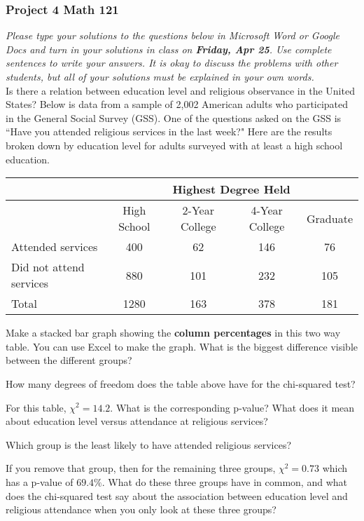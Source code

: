 \documentclass[12pt]{exam}
\begin{document}
\subsubsection*{Project 4 \hfill Math 121}

\textit{Please type your solutions to the questions below in Microsoft Word or Google Docs and turn in your solutions in class on \textbf{Friday, Apr 25}. Use complete sentences to write your answers. It is okay to discuss the problems with other students, but all of your solutions must be explained in your own words. } \\

\noindent
Is there a relation between education level and religious observance in the United States? Below is data from a sample of 2{,}002 American adults who participated in the General Social Survey (GSS).
One of the questions asked on the GSS is ``Have you attended religious services in the last week?"  Here are the results broken down by education level for adults surveyed with at least a high school education. 

\begin{center}
\begin{tabular}{l|cccc} 
& \multicolumn{4}{c}{Highest Degree Held} \\ \hline 
 & High School & 2-Year College & 4-Year College & Graduate \\ \hline
Attended services & 400 & 62 & 146 & 76 \\
Did not attend services & 880 & 101 & 232 & 105 \\ \hline
Total & 1280 & 163 & 378 & 181 \\ 
\end{tabular}
\end{center}

\begin{questions}
\item Make a stacked bar graph showing the \textbf{column percentages} in this two way table. You can use Excel to make the graph. What is the biggest difference visible between the different groups?
\vfill

\item How many degrees of freedom does the table above have for the chi-squared test?
\vfill

\item For this table, $\chi^2 = 14.2$. What is the corresponding p-value? What does it mean about education level versus attendance at religious services? 
\vfill

\item Which group is the least likely to have attended religious services?   
\vfill

\item If you remove that group, then for the remaining three groups, $\chi^2 = 0.73$ which has a p-value of $69.4\%$.  What do these three groups have in common, and what does the chi-squared test say about the association between education level and religious attendance when you only look at these three groups? 
\vfill

\end{questions}
\end{document}
